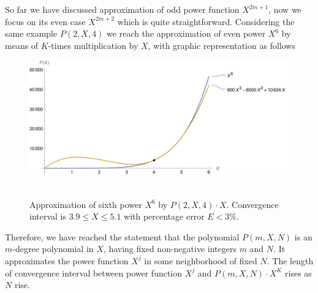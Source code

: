 So far we have discussed approximation of odd power function $X^{2m+1}$, now we focus on its even case $X^{2m+2}$
which is quite straightforward.
Considering the same example $P(2, X, 4)$ we reach the approximation of even power $X^6$
by means of $K$-times multiplication by $X$, with graphic representation as follows
\begin{figure}[H]
    \centering
    \includegraphics[width=1\textwidth]{sections/images/07_plot_of_6th_power_with_p_2_4_times_x}
    ~\caption{Approximation of sixth power $X^6$ by $P(2, X, 4) \cdot X$.
    Convergence interval is $3.9 \leq X \leq 5.1$ with percentage error $E < 3\%$.
    }\label{fig:07_plot_of_6th_power_with_p_2_4_times_x}
\end{figure}
Therefore, we have reached the statement that
the polynomial $P(m,X,N)$ is an $m$-degree polynomial in $X$, having fixed non-negative
integers $m$ and $N$.
It approximates the power function $X^{j}$ in some neighborhood of fixed $N$.
The length of convergence interval between power function $X^j$ and $P(m,X,N) \cdot X^K$ rises as $N$ rise.
